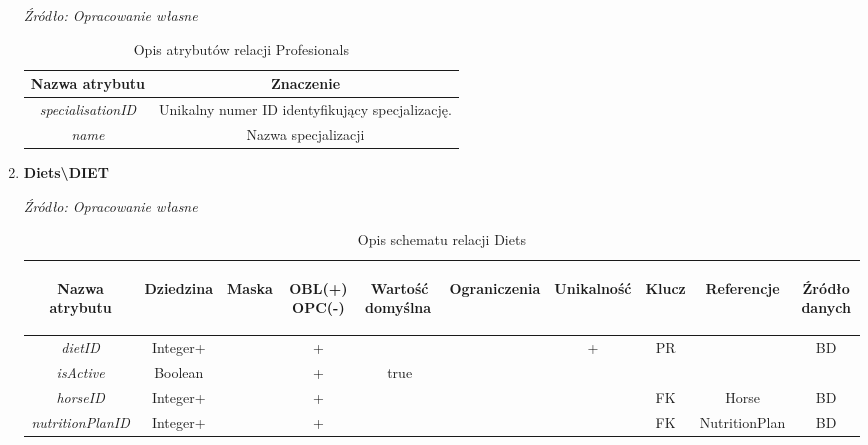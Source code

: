 \documentclass[12pt,twoside]{report}
\begin{document}
\begin{enumerate}[start=1,label={\bfseries REL\textbackslash0\arabic*}]
\begin{table}[H]
	\caption{Opis atrybutów relacji Profesionals}
	\textit{Źródło: Opracowanie własne}
	\label{SpecialisationsAttributeDescription}
	\centering
	\begin{tabular}{|c|c|}
		\hline
		Nazwa atrybutu & Znaczenie \\
		\hline
		\textit{specialisationID}& Unikalny numer ID identyfikujący specjalizację.\\
		\hline
		\textit{name}& Nazwa specjalizacji\\
		\hline
	\end{tabular}
\end{table}
\item \textbf{Diets\textbackslash DIET}
\begin{table}[H]
	\caption{Opis schematu relacji Diets}
	\textit{Źródło: Opracowanie własne}
	\label{DietsRelationSchema}
	\centering
	\begin{tabular}{|c|c|c|c|c|c|c|c|c|c|}
		\hline
		\begin{sideways}Nazwa atrybutu\end{sideways}& 
		\begin{sideways}Dziedzina \end{sideways}& 
		\begin{sideways}Maska \end{sideways}& 
		\begin{sideways}OBL(+) OPC(-)\end{sideways} & 
		\begin{sideways}Wartość domyślna$\ $\end{sideways}& 
		\begin{sideways}Ograniczenia\end{sideways} &
		\begin{sideways}Unikalność \end{sideways}& 
		\begin{sideways}Klucz \end{sideways}& 
		\begin{sideways}Referencje \end{sideways}&
		\begin{sideways}Źródło danych\end{sideways}\\
		\hline
		 \textit{dietID}&Integer+&&+&&&+&PR&&BD\\
		 \hline
		 \textit{isActive}&Boolean&&+&true&&&&&\\
		 \hline
		 \textit{horseID}&Integer+&&+&&&&FK&Horse&BD\\
		 \hline
		 \textit{nutritionPlanID}&Integer+&&+&&&&FK&NutritionPlan&BD\\
		 \hline
	\end{tabular}
\end{table}


\end{enumerate}
\end{document}
